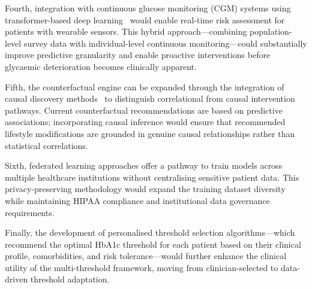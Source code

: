 \documentclass[conference]{IEEEtran}
\begin{document}
Fourth, integration with continuous glucose monitoring (CGM) systems using transformer-based deep learning~\cite{b17, b18} would enable real-time risk assessment for patients with wearable sensors. This hybrid approach---combining population-level survey data with individual-level continuous monitoring---could substantially improve predictive granularity and enable proactive interventions before glycaemic deterioration becomes clinically apparent.

Fifth, the counterfactual engine can be expanded through the integration of causal discovery methods~\cite{b6} to distinguish correlational from causal intervention pathways. Current counterfactual recommendations are based on predictive associations; incorporating causal inference would ensure that recommended lifestyle modifications are grounded in genuine causal relationships rather than statistical correlations.

Sixth, federated learning approaches offer a pathway to train models across multiple healthcare institutions without centralising sensitive patient data. This privacy-preserving methodology would expand the training dataset diversity while maintaining HIPAA compliance and institutional data governance requirements.

Finally, the development of personalised threshold selection algorithms---which recommend the optimal HbA1c threshold for each patient based on their clinical profile, comorbidities, and risk tolerance---would further enhance the clinical utility of the multi-threshold framework, moving from clinician-selected to data-driven threshold adaptation.
\end{document}
